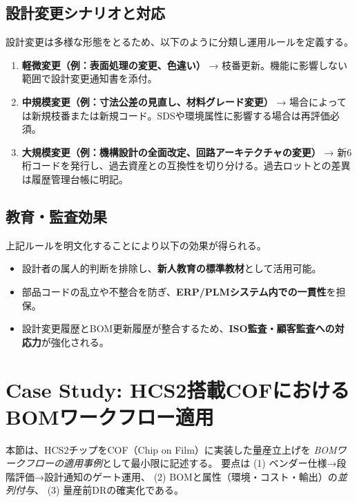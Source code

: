 \documentclass[10pt,conference]{IEEEtran}
\begin{document}
\subsection{設計変更シナリオと対応}
設計変更は多様な形態をとるため、以下のように分類し運用ルールを定義する。
\begin{enumerate}
  \item \textbf{軽微変更（例：表面処理の変更、色違い）}  
  → 枝番更新。機能に影響しない範囲で設計変更通知書を添付。
  \item \textbf{中規模変更（例：寸法公差の見直し、材料グレード変更）}  
  → 場合によっては新規枝番または新規コード。SDSや環境属性に影響する場合は再評価必須。
  \item \textbf{大規模変更（例：機構設計の全面改定、回路アーキテクチャの変更）}  
  → 新6桁コードを発行し、過去資産との互換性を切り分ける。過去ロットとの差異は履歴管理台帳に明記。
\end{enumerate}

\subsection{教育・監査効果}
上記ルールを明文化することにより以下の効果が得られる。
\begin{itemize}
  \item 設計者の属人的判断を排除し、\textbf{新人教育の標準教材}として活用可能。
  \item 部品コードの乱立や不整合を防ぎ、\textbf{ERP/PLMシステム内での一貫性}を担保。
  \item 設計変更履歴とBOM更新履歴が整合するため、\textbf{ISO監査・顧客監査への対応力}が強化される。
\end{itemize}

\section{Case Study: HCS2搭載COFにおけるBOMワークフロー適用}
本節は、HCS2チップをCOF（Chip on Film）に実装した量産立上げを
\emph{BOMワークフローの適用事例}として最小限に記述する。
要点は (1) ベンダー仕様→段階評価→設計通知のゲート運用、
(2) BOMと属性（環境・コスト・輸出）の\emph{並列付与}、
(3) 量産前DRの確実化である。
\end{document}
